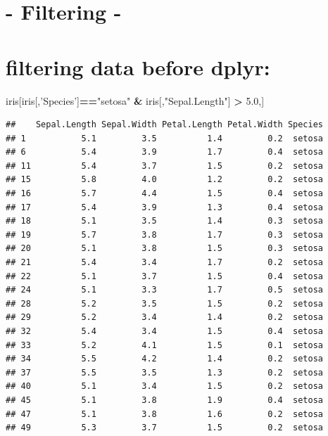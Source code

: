 \documentclass[]{article}
\newenvironment{Shaded}{\begin{snugshade}}{\end{snugshade}}
\newcommand{\FloatTok}[1]{\textcolor[rgb]{0.00,0.00,0.81}{#1}}
\newcommand{\NormalTok}[1]{#1}
\newcommand{\OperatorTok}[1]{\textcolor[rgb]{0.81,0.36,0.00}{\textbf{#1}}}
\newcommand{\StringTok}[1]{\textcolor[rgb]{0.31,0.60,0.02}{#1}}
\begin{document}
\hypertarget{filtering--}{%
\section{- Filtering -}\label{filtering--}}

\hypertarget{filtering-data-before-dplyr}{%
\section{filtering data before
dplyr:}\label{filtering-data-before-dplyr}}

\begin{Shaded}
\begin{Highlighting}[]
\NormalTok{iris[iris[,}\StringTok{'Species'}\NormalTok{]}\OperatorTok{==}\StringTok{"setosa"} \OperatorTok{&}\StringTok{ }\NormalTok{iris[,}\StringTok{"Sepal.Length"}\NormalTok{] }\OperatorTok{>}\StringTok{ }\FloatTok{5.0}\NormalTok{,]}
\end{Highlighting}
\end{Shaded}

\begin{verbatim}
##    Sepal.Length Sepal.Width Petal.Length Petal.Width Species
## 1           5.1         3.5          1.4         0.2  setosa
## 6           5.4         3.9          1.7         0.4  setosa
## 11          5.4         3.7          1.5         0.2  setosa
## 15          5.8         4.0          1.2         0.2  setosa
## 16          5.7         4.4          1.5         0.4  setosa
## 17          5.4         3.9          1.3         0.4  setosa
## 18          5.1         3.5          1.4         0.3  setosa
## 19          5.7         3.8          1.7         0.3  setosa
## 20          5.1         3.8          1.5         0.3  setosa
## 21          5.4         3.4          1.7         0.2  setosa
## 22          5.1         3.7          1.5         0.4  setosa
## 24          5.1         3.3          1.7         0.5  setosa
## 28          5.2         3.5          1.5         0.2  setosa
## 29          5.2         3.4          1.4         0.2  setosa
## 32          5.4         3.4          1.5         0.4  setosa
## 33          5.2         4.1          1.5         0.1  setosa
## 34          5.5         4.2          1.4         0.2  setosa
## 37          5.5         3.5          1.3         0.2  setosa
## 40          5.1         3.4          1.5         0.2  setosa
## 45          5.1         3.8          1.9         0.4  setosa
## 47          5.1         3.8          1.6         0.2  setosa
## 49          5.3         3.7          1.5         0.2  setosa
\end{verbatim}
\end{document}
